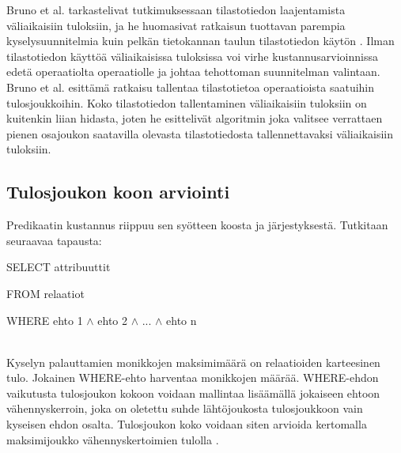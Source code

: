 \documentclass[finnish]{tktltiki2}
\theoremstyle{definition}
\theoremstyle{remark}
\begin{document}
Bruno et al. tarkastelivat tutkimuksessaan tilastotiedon laajentamista väliaikaisiin tuloksiin, ja he huomasivat ratkaisun tuottavan parempia kyselysuunnitelmia kuin pelkän tietokannan taulun tilastotiedon käytön \cite{bruno2002exploiting}. Ilman tilastotiedon käyttöä väliaikaisissa tuloksissa voi virhe kustannusarvioinnissa edetä operaatiolta operaatiolle ja johtaa tehottoman suunnitelman valintaan. Bruno et al. esittämä ratkaisu tallentaa tilastotietoa operaatioista saatuihin tulosjoukkoihin. Koko tilastotiedon tallentaminen väliaikaisiin tuloksiin on kuitenkin liian hidasta, joten he esittelivät algoritmin joka valitsee verrattaen pienen osajoukon saatavilla olevasta tilastotiedosta tallennettavaksi väliaikaisiin tuloksiin.

\subsection{Tulosjoukon koon arviointi}
Predikaatin kustannus riippuu sen syötteen koosta ja järjestyksestä. Tutkitaan seuraavaa tapausta:
\newline

\begin{frame}

SELECT attribuuttit

FROM relaatiot

WHERE ehto 1 $\wedge$ ehto 2 $\wedge$ ... $\wedge$ ehto n
\end{frame}
\\\newline
Kyselyn palauttamien monikkojen maksimimäärä on relaatioiden karteesinen tulo. Jokainen WHERE-ehto harventaa monikkojen määrää. WHERE-ehdon vaikutusta tulosjoukon kokoon voidaan mallintaa lisäämällä jokaiseen ehtoon vähennyskerroin, joka on oletettu suhde lähtöjoukosta tulosjoukkoon vain kyseisen ehdon osalta. 
Tulosjoukon koko voidaan siten arvioida kertomalla maksimijoukko vähennyskertoimien tulolla \cite{ramakrishnan2003database}. 
\end{document}
